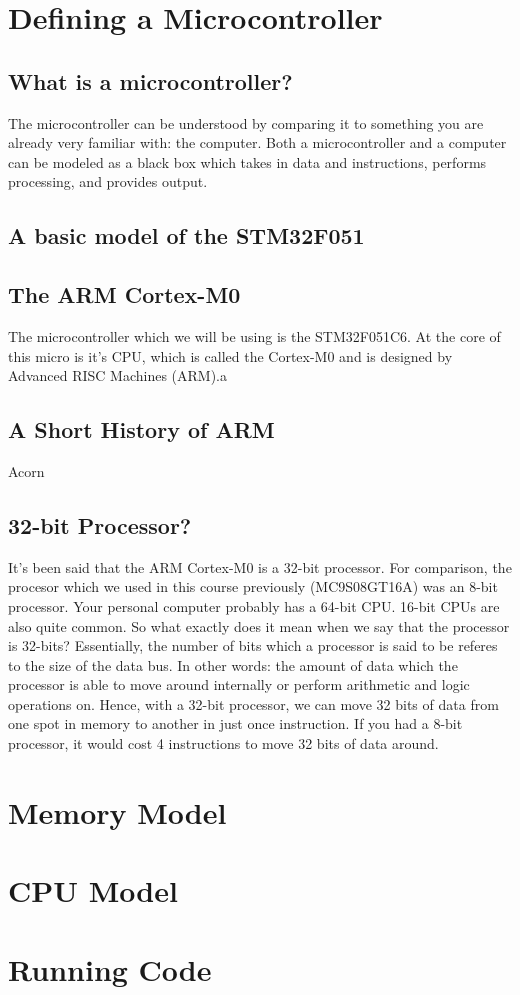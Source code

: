 \section{Defining a Microcontroller}

\subsection{What is a microcontroller?}
The microcontroller can be understood by comparing it to something you are already very familiar with: the computer. Both a microcontroller and a computer can be modeled as a black box which takes in data and instructions, performs processing, and provides output.

\subsection{A basic model of the STM32F051}

\subsection{The ARM Cortex-M0}
The microcontroller which we will be using is the STM32F051C6. At the core of this micro is it's CPU, which is called the Cortex-M0 and is designed by Advanced RISC Machines (ARM).a

\subsection{A Short History of ARM}
Acorn

\subsection{32-bit Processor?}
It's been said that the ARM Cortex-M0 is a 32-bit processor. For comparison, the procesor which we used in this course previously (MC9S08GT16A) was an 8-bit processor. Your personal computer probably has a 64-bit CPU. 16-bit CPUs are also quite common. So what exactly does it mean when we say that the processor is 32-bits? Essentially, the number of bits which a processor is said to be referes to the size of the data bus. In other words: the amount of data which the processor is able to move around internally or perform arithmetic and logic operations on. Hence, with a 32-bit processor, we can move 32 bits of data from one spot in memory to another in just once instruction. If you had a 8-bit processor, it would cost 4 instructions to move 32 bits of data around.  

\section{Memory Model}

\section{CPU Model}

\section{Running Code}
